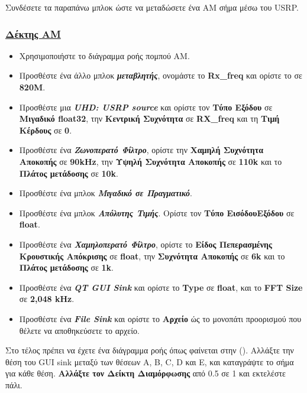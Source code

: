 \documentclass[12pt]{report}
\begin{document}
            Συνδέσετε τα παραπάνω μπλοκ ώστε να μεταδώσετε ένα AM σήμα μέσω του USRP.

            \subsubsection*{\textsf{\underline{Δέκτης AM}}}
            \begin{itemize}
                \item Χρησιμοποιήστε το διάγραμμα ροής πομπού AM.
                \item Προσθέστε ένα άλλο μπλοκ \textbf{\textit{μεταβλητής}}, 
                    ονομάστε το \textbf{Rx\_freq} και ορίστε το σε \textbf{820M}.
                \item Προσθέστε μια \textbf{\textit{UHD: USRP source}} και ορίστε τον \textbf{Τύπο Εξόδου}
                 σε \textbf{Μιγαδικό float32}, την \textbf{Κεντρική Συχνότητα} σε \textbf{RX\_freq} και τη
                 \textbf{Τιμή Κέρδους} σε \textbf{0}.
                \item Προσθέστε ένα \textbf{\textit{Ζωνοπερατό Φίλτρο}}, ορίστε την 
                 \textbf{Χαμηλή Συχνότητα Αποκοπής} σε \textbf{90kHz},
                 την \textbf{Υψηλή Συχνότητα Αποκοπής} σε \textbf{110k} και το \textbf{Πλάτος μετάδοσης} σε \textbf{10k}.
                \item Προσθέστε ένα μπλοκ \textbf{\textit{Μιγαδικό σε Πραγματικό}}.
                \item Προσθέστε ένα μπλοκ \textbf{\textit{Απόλυτης Τιμής}}.
                 Ορίστε τον \textbf{Τύπο ΕισόδουΕξόδου} σε \textbf{float}.
                \item Προσθέστε ένα \textbf{\textit{Χαμηλοπερατό Φίλτρο}}, ορίστε το 
                 \textbf{Είδος Πεπερασμένης Κρουστικής Απόκρισης} σε \textbf{float}, 
                 την \textbf{Συχνότητα Αποκοπής} σε \textbf{6k} και το \textbf{Πλάτος μετάδοσης} σε \textbf{1k}.
                \item Προσθέστε ένα \textbf{\textit{QT GUI Sink}} και ορίστε το \textbf{Type} σε
                 \textbf{float}, και το \textbf{FFT Size} σε \textbf{2,048 kHz}.
                \item Προσθέστε ένα \textbf{\textit{File Sink}} και ορίστε το \textbf{Αρχείο} ώς το μονοπάτι
                 προορισμού που θέλετε να αποθηκεύσετε το αρχείο.
            \end{itemize}
                Στο τέλος πρέπει να έχετε ένα διάγραμμα ροής όπως φαίνεται στην (). Αλλάξτε την θέση του GUI sink
                μεταξύ των θέσεων A, B, C, D και E, και καταγράψτε το σήμα για κάθε θέση. \textbf{Αλλάξτε τον Δείκτη
                Διαμόρφωσης} από 0.5 σε 1 και εκτελέστε πάλι.
\end{document}
